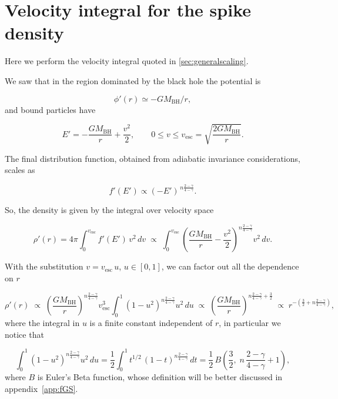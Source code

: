 \section{Velocity integral for the spike density}
\label{app:spikevelocity}

Here we perform the velocity integral quoted in \cref{sec:generalscaling}.

We saw that in the region dominated by the black hole the potential is

\begin{equation}
    \phi'(r) \simeq -GM_{\mathrm{BH}}/r,
\end{equation}
and bound particles have 

\begin{equation}
E' = -\frac{GM_{\mathrm{BH}}}{r} + \frac{v^2}{2},
\qquad
0 \le v \le v_{\mathrm{esc}} = \sqrt{\frac{2GM_{\mathrm{BH}}}{r}} .
\end{equation}

The final distribution function, obtained from adiabatic invariance considerations, scales as

\begin{equation}
    f'(E') \propto (-E')^{\,n\frac{2-\gamma}{4-\gamma}}.
\end{equation}

So, the density is given by the integral over velocity space

\begin{equation}
\rho'(r)
= 4\pi \int_0^{v_{\mathrm{esc}}} f'(E')\, v^2\, dv
\;\propto\;
\int_0^{v_{\mathrm{esc}}}
\left( \frac{GM_{\mathrm{BH}}}{r} - \frac{v^2}{2} \right)^{\! n\frac{2-\gamma}{4-\gamma}} v^2\, dv .
\end{equation}


With the substitution $v = v_{\mathrm{esc}}\, u$, $u \in [0,1]$, we can
factor out all the dependence on $r$

\begin{equation}
\rho'(r)
\;\propto\;
\left( \frac{GM_{\mathrm{BH}}}{r} \right)^{n\frac{2-\gamma}{4-\gamma}}
v_{\mathrm{esc}}^{3}
\int_0^1 \left(1-u^2\right)^{n\frac{2-\gamma}{4-\gamma}} u^2\, du
\;\propto\;
\left( \frac{GM_{\mathrm{BH}}}{r} \right)^{n\frac{2-\gamma}{4-\gamma}+\frac{3}{2}}
\;\propto\;
r^{-\left(\frac{3}{2} + n\frac{2-\gamma}{4-\gamma}\right)} ,
\end{equation}
where the integral in $u$ is a finite constant independent of $r$, in particular we notice that

\begin{equation}
\int_0^1 \left(1-u^2\right)^{n\frac{2-\gamma}{4-\gamma}} u^2\, du
= \frac{1}{2}\int_0^1 t^{1/2}\,(1-t)^{n\frac{2-\gamma}{4-\gamma}}\, dt
= \frac{1}{2}\,
B\!\left(\frac{3}{2},\; n\,\frac{2-\gamma}{4-\gamma}+1\right),
\end{equation}
where $B$ is Euler's Beta function, whose definition will be better discussed in appendix~\ref{app:fGS}.

